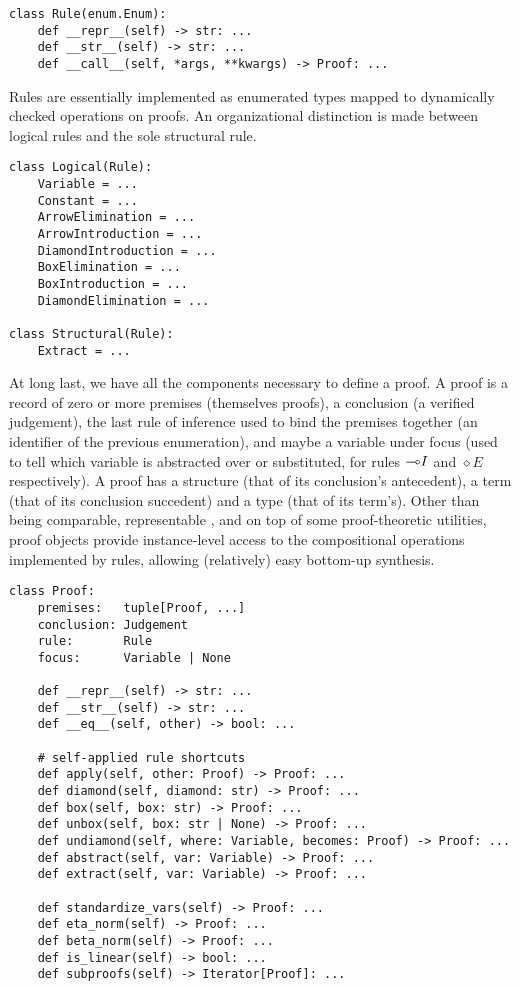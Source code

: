\begin{verbatim}
class Rule(enum.Enum):
    def __repr__(self) -> str: ...
    def __str__(self) -> str: ...
    def __call__(self, *args, **kwargs) -> Proof: ...
\end{verbatim}

\noindent Rules are essentially implemented as enumerated types mapped to dynamically checked operations on proofs.
An organizational distinction is made between logical rules and the sole structural rule.

\begin{verbatim}
class Logical(Rule):
    Variable = ...
    Constant = ...
    ArrowElimination = ...
    ArrowIntroduction = ...
    DiamondIntroduction = ...
    BoxElimination = ...
    BoxIntroduction = ...
    DiamondElimination = ...

class Structural(Rule):
    Extract = ...
\end{verbatim}

\noindent At long last, we have all the components necessary to define a proof.
A proof is a record of zero or more premises (themselves proofs), a conclusion (a verified judgement), the last rule of inference used to bind the premises together (an identifier of the previous enumeration), and maybe a variable under focus (used to tell which variable is abstracted over or substituted, for rules $\li I$ and $\diamond E$ respectively).
A proof has a structure (that of its conclusion's antecedent), a term (that of its conclusion succedent) and a type (that of its term's).
Other than being comparable, representable , and on top of some proof-theoretic utilities, proof objects provide instance-level access to the compositional operations implemented by rules, allowing (relatively) easy bottom-up synthesis.

\begin{verbatim}
class Proof:
    premises:   tuple[Proof, ...]
    conclusion: Judgement
    rule:       Rule
    focus:      Variable | None
    
    def __repr__(self) -> str: ...
    def __str__(self) -> str: ...
    def __eq__(self, other) -> bool: ...
    
    # self-applied rule shortcuts
    def apply(self, other: Proof) -> Proof: ...
    def diamond(self, diamond: str) -> Proof: ...
    def box(self, box: str) -> Proof: ...
    def unbox(self, box: str | None) -> Proof: ...
    def undiamond(self, where: Variable, becomes: Proof) -> Proof: ... 
    def abstract(self, var: Variable) -> Proof: ...
    def extract(self, var: Variable) -> Proof: ...

    def standardize_vars(self) -> Proof: ...
    def eta_norm(self) -> Proof: ...
    def beta_norm(self) -> Proof: ...
    def is_linear(self) -> bool: ...
    def subproofs(self) -> Iterator[Proof]: ...

\end{verbatim}

